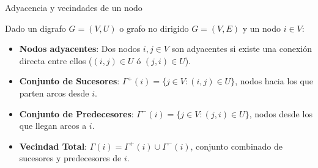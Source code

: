 \documentclass[
  ignorenonframetext,
]{beamer}
\providecommand{\tightlist}{%
  \setlength{\itemsep}{0pt}\setlength{\parskip}{0pt}}
\begin{document}
\begin{frame}{Adyacencia y vecindades de un nodo}
\label{adyacencia-y-vecindades-de-un-nodo}
\begin{tcolorbox}[enhanced jigsaw, left=2mm, opacityback=0, titlerule=0mm, breakable, toptitle=1mm, rightrule=.15mm, bottomtitle=1mm, coltitle=black, title=\textcolor{quarto-callout-note-color}{\faInfo}\hspace{0.5em}{Definición: Adyacencia y vecindades}, colframe=quarto-callout-note-color-frame, colbacktitle=quarto-callout-note-color!10!white, arc=.35mm, toprule=.15mm, leftrule=.75mm, bottomrule=.15mm, opacitybacktitle=0.6, colback=white]

Dado un digrafo \(G = (V, U)\) o grafo no dirigido \(G = (V, E)\) y un
nodo \(i \in V\):

\begin{itemize}
\tightlist
\item
  \textbf{Nodos adyacentes}: Dos nodos \(i, j \in V\) son adyacentes si
  existe una conexión directa entre ellos (\((i,j) \in U\) ó
  \((j,i) \in U\)).
\item
  \textbf{Conjunto de Sucesores}:
  \(\Gamma^+(i) = \{j \in V : (i, j) \in U\}\), nodos hacia los que
  parten arcos desde \(i\).
\item
  \textbf{Conjunto de Predecesores}:
  \(\Gamma^-(i) = \{j \in V : (j, i) \in U\}\), nodos desde los que
  llegan arcos a \(i\).
\item
  \textbf{Vecindad Total}: \(\Gamma(i) = \Gamma^+(i) \cup \Gamma^-(i)\),
  conjunto combinado de sucesores y predecesores de \(i\).
\end{itemize}

\end{tcolorbox}
\end{frame}
\end{document}
